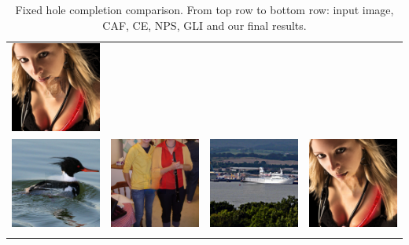 \begin{longtable}{cccc}
  \includegraphics[width=.24\textwidth]{figures/imagenet/imagenet_0197_g.png}\\
  \includegraphics[width=.24\textwidth]{figures/imagenet/imagenet_0011_synthesized_image.png}&
  \includegraphics[width=.24\textwidth]{figures/imagenet/imagenet_0034_synthesized_image.png}&
  \includegraphics[width=.24\textwidth]{figures/imagenet/imagenet_0165_synthesized_image.png}&
  \includegraphics[width=.24\textwidth]{figures/imagenet/imagenet_0197_synthesized_image.png}\\
\caption{Fixed hole completion comparison. From top row to bottom row: input image, CAF, CE, NPS, GLI and our final results.}
\end{longtable}

\label{fig:center}
\vspace{-10pt}

